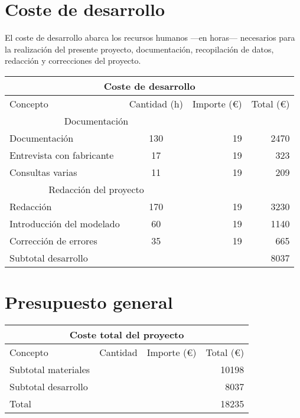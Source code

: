 \chapter*{Coste de desarrollo}
El coste de desarrollo abarca los recursos humanos —en horas— necesarios para la realización del presente proyecto, documentación, recopilación de datos, redacción y correcciones del proyecto.

\begin{table}[!htb]
\centering
\begin{tabular}{lcrr}
\toprule
\multicolumn{4}{c}{Coste de desarrollo}\\
\midrule
Concepto & Cantidad (h) & Importe (\euro) & Total (\euro)\\
\midrule
\multicolumn{2}{c}{Documentación}\\
\cmidrule(r){1-2}
Documentación & 130 & 19 & 2470\\
Entrevista con fabricante & 17 & 19 & 323\\
Consultas varias & 11 & 19 & 209\\
\multicolumn{2}{c}{Redacción del proyecto}\\
\cmidrule(r){1-2}
Redacción & 170 & 19 & 3230\\
Introducción del modelado & 60 & 19 & 1140\\
Corrección de errores & 35 & 19 & 665\\
\bottomrule
Subtotal desarrollo & & & 8037\\
\bottomrule
\end{tabular}
\label{presupuestodesarrollo}
\end{table}

\chapter*{Presupuesto general}

\begin{table}[!htb]
\centering
\begin{tabular}{lcrr}
\toprule
\multicolumn{4}{c}{Coste total del proyecto}\\
\midrule
Concepto & Cantidad & Importe (\euro) & Total (\euro)\\
\midrule
Subtotal materiales & & & 10198\\
Subtotal desarrollo & & & 8037\\
\bottomrule
Total & & & 18235\\
\bottomrule
\end{tabular}
\label{presupuestototal}
\end{table}

